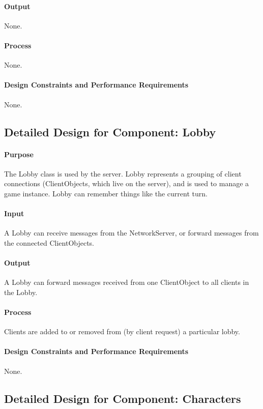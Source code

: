 \documentclass[12pt,a4paper]{article}
\begin{document}
\paragraph{Output} None.
\paragraph{Process} None.
\paragraph{Design Constraints and Performance Requirements} None.
	
\subsection{Detailed Design for Component: Lobby }
\paragraph{Purpose} The Lobby class is used by the server. Lobby represents a grouping of client connections (ClientObjects, which live on the server), and is used to manage a game instance. Lobby can remember things like the current turn. 
\paragraph{Input} A Lobby can receive messages from the NetworkServer, or forward messages from the connected ClientObjects. 
\paragraph{Output} A Lobby can forward messages received from one ClientObject to all clients in the Lobby.
\paragraph{Process} Clients are added to or removed from (by client request) a particular lobby. 
\paragraph{Design Constraints and Performance Requirements} None.

\subsection{Detailed Design for Component: Characters}
\end{document}
